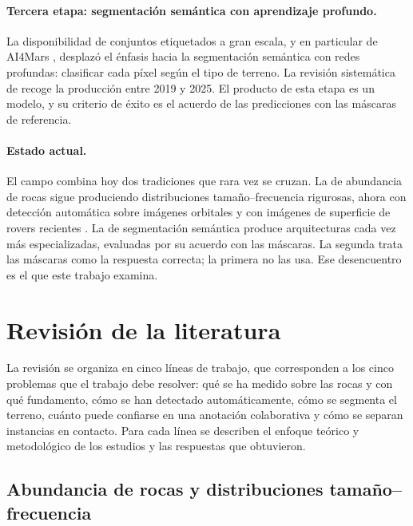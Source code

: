 \paragraph{Tercera etapa: segmentación semántica con aprendizaje profundo.} La disponibilidad
de conjuntos etiquetados a gran escala, y en particular de AI4Mars \citep{swan2021ai4mars},
desplazó el énfasis hacia la segmentación semántica con redes profundas: clasificar cada
píxel según el tipo de terreno. La revisión sistemática de \citet{qu2025review} recoge la
producción entre 2019 y 2025. El producto de esta etapa es un modelo, y su criterio de éxito
es el acuerdo de las predicciones con las máscaras de referencia.

\paragraph{Estado actual.} El campo combina hoy dos tradiciones que rara vez se cruzan. La de
abundancia de rocas sigue produciendo distribuciones tamaño--frecuencia rigurosas, ahora con
detección automática sobre imágenes orbitales \citep{chen2022zhurong} y con imágenes de
superficie de rovers recientes \citep{sun2024zhurong, wang2024zhurong}. La de segmentación
semántica produce arquitecturas cada vez más especializadas, evaluadas por su acuerdo con las
máscaras. La segunda trata las máscaras como la respuesta correcta; la primera no las usa. Ese
desencuentro es el que este trabajo examina.

\section{Revisión de la literatura}
\label{sec:revision}

La revisión se organiza en cinco líneas de trabajo, que corresponden a los cinco problemas
que el trabajo debe resolver: qué se ha medido sobre las rocas y con qué fundamento, cómo se
han detectado automáticamente, cómo se segmenta el terreno, cuánto puede confiarse en una
anotación colaborativa y cómo se separan instancias en contacto. Para cada línea se describen
el enfoque teórico y metodológico de los estudios y las respuestas que obtuvieron.

\subsection{Abundancia de rocas y distribuciones tamaño--frecuencia}
\label{sec:rev-abundancia}

